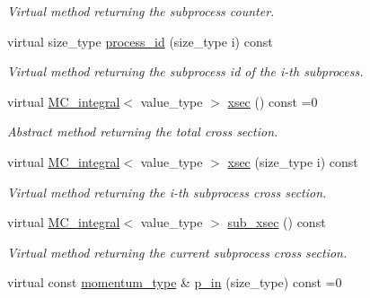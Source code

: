 \begin{DoxyCompactItemize}
\begin{DoxyCompactList}\small\item\em Virtual method returning the subprocess counter. \end{DoxyCompactList}\item 
\hypertarget{a00442_a5930bc44696691ed869bb5ac7173dd1f}{virtual size\-\_\-type \hyperlink{a00442_a5930bc44696691ed869bb5ac7173dd1f}{process\-\_\-id} (size\-\_\-type i) const }\label{a00442_a5930bc44696691ed869bb5ac7173dd1f}

\begin{DoxyCompactList}\small\item\em Virtual method returning the subprocess id of the i-\/th subprocess. \end{DoxyCompactList}\item 
\hypertarget{a00442_ac566cf6311f00e3988f99148b42eda90}{virtual \hyperlink{a00363}{M\-C\-\_\-integral}$<$ value\-\_\-type $>$ \hyperlink{a00442_ac566cf6311f00e3988f99148b42eda90}{xsec} () const =0}\label{a00442_ac566cf6311f00e3988f99148b42eda90}

\begin{DoxyCompactList}\small\item\em Abstract method returning the total cross section. \end{DoxyCompactList}\item 
\hypertarget{a00442_a2e629cc4c877cf4208da9c904aa1efd9}{virtual \hyperlink{a00363}{M\-C\-\_\-integral}$<$ value\-\_\-type $>$ \hyperlink{a00442_a2e629cc4c877cf4208da9c904aa1efd9}{xsec} (size\-\_\-type i) const }\label{a00442_a2e629cc4c877cf4208da9c904aa1efd9}

\begin{DoxyCompactList}\small\item\em Virtual method returning the i-\/th subprocess cross section. \end{DoxyCompactList}\item 
\hypertarget{a00442_ae971360f5465b09ca100b995722a7f48}{virtual \hyperlink{a00363}{M\-C\-\_\-integral}$<$ value\-\_\-type $>$ \hyperlink{a00442_ae971360f5465b09ca100b995722a7f48}{sub\-\_\-xsec} () const }\label{a00442_ae971360f5465b09ca100b995722a7f48}

\begin{DoxyCompactList}\small\item\em Virtual method returning the current subprocess cross section. \end{DoxyCompactList}\item 
\hypertarget{a00442_aa114103671c3305f3728e10b8623a7ea}{virtual const \hyperlink{a00559}{momentum\-\_\-type} \& \hyperlink{a00442_aa114103671c3305f3728e10b8623a7ea}{p\-\_\-in} (size\-\_\-type) const =0}\label{a00442_aa114103671c3305f3728e10b8623a7ea}


\end{DoxyCompactItemize}

